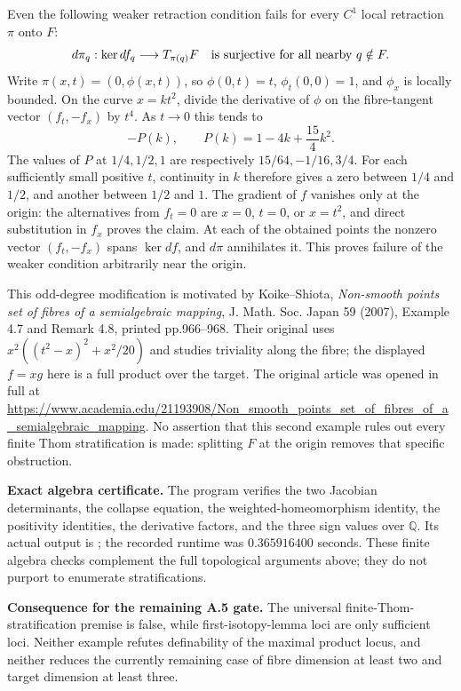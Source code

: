 Even the following weaker retraction condition fails for every
\(C^1\) local retraction \(\pi\) onto \(F\):
\[
       d\pi_q:\ker df_q\longrightarrow T_{\pi(q)}F
                    \quad\hbox{is surjective for all nearby }q\notin F.
\]
Write \(\pi(x,t)=(0,\phi(x,t))\), so
\(\phi(0,t)=t\), \(\phi_t(0,0)=1\), and \(\phi_x\) is locally bounded.
On the curve \(x=kt^2\), divide the derivative of \(\phi\) on the
fibre-tangent vector \((f_t,-f_x)\) by \(t^4\). As \(t\to0\) this tends to
\[
             -P(k),\qquad P(k)=1-4k+\frac{15}{4}k^2.
\]
The values of \(P\) at \(1/4,1/2,1\) are respectively
\(15/64,-1/16,3/4\).
For each sufficiently small positive \(t\), continuity in \(k\)
therefore gives a zero between \(1/4\) and \(1/2\), and another
between \(1/2\) and \(1\).
The gradient of \(f\) vanishes only at the origin: the alternatives
from \(f_t=0\) are \(x=0\), \(t=0\), or \(x=t^2\), and direct
substitution in \(f_x\) proves the claim.
At each of the obtained points the nonzero vector
\((f_t,-f_x)\) spans \(\ker df\), and \(d\pi\) annihilates it.
This proves failure of the weaker condition arbitrarily near the origin.

This odd-degree modification is motivated by Koike--Shiota,
\emph{Non-smooth points set of fibres of a semialgebraic mapping},
J. Math. Soc. Japan 59 (2007), Example 4.7 and Remark 4.8,
printed pp.966--968. Their original uses
\(x^2((t^2-x)^2+x^2/20)\) and studies triviality along the fibre;
the displayed \(f=xg\) here is a full product over the target.
The original article was opened in full at
\url{https://www.academia.edu/21193908/Non_smooth_points_set_of_fibres_of_a_semialgebraic_mapping}.
No assertion that this second example rules out every finite
Thom stratification is made: splitting \(F\) at the origin
removes that specific obstruction.

\medskip\noindent\textbf{Exact algebra certificate.}
The program  verifies the two
Jacobian determinants, the collapse equation, the weighted-homeomorphism
identity, the positivity identities, the derivative factors, and
the three sign values over \(\mathbb Q\).
Its actual output is ;
the recorded runtime was \(0.365916400\) seconds.
These finite algebra checks complement the full topological
arguments above; they do not purport to enumerate stratifications.

\medskip\noindent\textbf{Consequence for the remaining A.5 gate.}
The universal finite-Thom-stratification premise is false,
while first-isotopy-lemma loci are only sufficient loci.
Neither example refutes definability of the maximal product locus,
and neither reduces the currently remaining case of fibre dimension
at least two and target dimension at least three.
